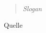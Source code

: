 \thispagestyle{empty}
\vspace*{\fill}
\begin{center}
    \begin{quote}
        \textit{Slogan}
    \end{quote}
    \begin{flushright}
        \begin{small}
            Quelle 
        \end{small}
    \end{flushright}
\end{center}
\vfill
